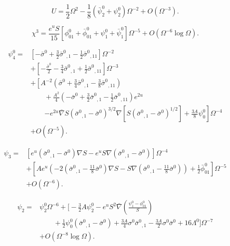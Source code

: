 \begin{equation}
U
=
\frac{1}{2}\Omega^2
-
\frac{1}{8}
\left(
\bar{\psi}_2^0+\psi_2^0
\right)\Omega^{-2}
+
O(\Omega^{-3}).
\tag{7.33}
\end{equation}

\begin{equation}
\chi^3
=
\frac{e^uS}{15}
\left[
\phi_{01}^0
+
\bar{\phi}_{01}^0
+
\psi_1^0
+
\bar{\psi}_1^0
\right]\Omega^{-5}
+
O(\Omega^{-6}\log\Omega).
\tag{7.34}
\end{equation}

\begin{equation}
\begin{aligned}
\psi_4^0
={}&
\left[
-\bar{\sigma}^0
+
\frac{3}{2}\bar{\sigma}^0{}_{,1}
-
\frac{1}{2}\bar{\sigma}^0{}_{,11}
\right]\Omega^{-2}
\\
&+
\left[
-\frac{\bar{\sigma}^0}{2}
-
\frac{3}{4}\bar{\sigma}^0{}_{,1}
+
\frac{1}{2}\bar{\sigma}^0{}_{,11}
\right]\Omega^{-3}
\\
&+
\left[
A^{-2}
\left(
\bar{\sigma}^0
+
\frac{3}{4}\bar{\sigma}^0{}_{,1}
-
\frac{3}{8}\bar{\sigma}^0{}_{,11}
\right)
\right.
\\
&\qquad
+
\frac{A^2}{4}
\left(
-\bar{\sigma}^0
+
\frac{3}{2}\bar{\sigma}^0{}_{,1}
-
\frac{1}{2}\bar{\sigma}^0{}_{,11}
\right)e^{2u}
\\
&\qquad\left.
-
e^{2u}\bar{\nabla}S
\left(
\bar{\sigma}^0{}_{,1}
-
\bar{\sigma}^0
\right)^{3/2}
\nabla
\left[
S
\left(
\bar{\sigma}^0{}_{,1}
-
\bar{\sigma}^0
\right)^{1/2}
\right]
+
\frac{3A}{8}\psi_0^0
\right]\Omega^{-4}
\\
&+
O(\Omega^{-5}).
\end{aligned}
\tag{7.35}
\end{equation}

\begin{equation}
\begin{aligned}
\psi_3
={}&
\left[
e^u
\left(
\bar{\sigma}^0{}_{,1}
-
\bar{\sigma}^0
\right)\nabla S
-
e^uS\nabla
\left(
\bar{\sigma}^0{}_{,1}
-
\bar{\sigma}^0
\right)
\right]\Omega^{-4}
\\
&+
\left[
Ae^u
\left(
-2
\left(
\bar{\sigma}^0{}_{,1}
-
\frac{11}{8}\bar{\sigma}^0
\right)\nabla S
-
S\nabla
\left(
\bar{\sigma}^0{}_{,1}
-
\frac{11}{8}\bar{\sigma}^0
\right)
\right)
+
\frac{1}{2}\bar{\phi}_{01}^0
\right]\Omega^{-5}
\\
&+
O(\Omega^{-6}).
\end{aligned}
\tag{7.36}
\end{equation}


\begin{equation}
\begin{aligned}
\psi_2
={}&
\psi_2^0\Omega^{-6}
+
\Bigg[
-\frac{3}{2}A\psi_2^0
-
e^u S^2\bar{\nabla}
\left(
\frac{\psi_1^0-\phi_{01}^0}{S}
\right)
\\
&\qquad
+
\frac{1}{2}\psi_0^0
\left(
\bar{\sigma}^0{}_{,1}-\bar{\sigma}^0
\right)
+
\frac{3A}{4}\sigma^0\bar{\sigma}^0{}_{,1}
-
\frac{3A}{2}\sigma^0\bar{\sigma}^0
+
16\Lambda^0
\Bigg]\Omega^{-7}
\\
&+
O(\Omega^{-8}\log\Omega).
\end{aligned}
\tag{7.37}
\end{equation}

